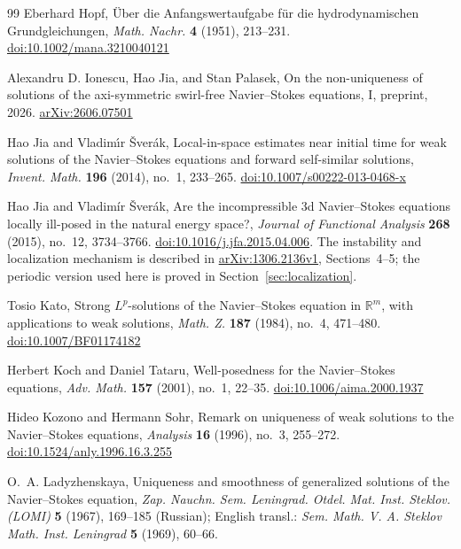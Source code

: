 \begin{thebibliography}{99}
Eberhard Hopf, \"{U}ber die Anfangswertaufgabe f\"{u}r die hydrodynamischen Grundgleichungen,
\emph{Math. Nachr.} \textbf{4} (1951), 213--231.
\href{https://doi.org/10.1002/mana.3210040121}{doi:10.1002/mana.3210040121}

Alexandru D. Ionescu, Hao Jia, and Stan Palasek, On the non-uniqueness of solutions of the axi-symmetric
swirl-free Navier--Stokes equations, I, preprint, 2026.
\href{https://arxiv.org/abs/2606.07501}{arXiv:2606.07501}

Hao Jia and Vladim\'{\i}r \v{S}ver\'{a}k, Local-in-space estimates near initial time for weak solutions of
the Navier--Stokes equations and forward self-similar solutions, \emph{Invent. Math.} \textbf{196}
(2014), no.~1, 233--265.
\href{https://doi.org/10.1007/s00222-013-0468-x}{doi:10.1007/s00222-013-0468-x}

Hao Jia and Vladim\'{i}r \v{S}ver\'{a}k,
Are the incompressible 3d Navier--Stokes equations locally ill-posed
in the natural energy space?,
\emph{Journal of Functional Analysis} \textbf{268} (2015),
no.~12, 3734--3766.
\href{https://doi.org/10.1016/j.jfa.2015.04.006}{doi:10.1016/j.jfa.2015.04.006}.
The instability and localization mechanism is described in
\href{https://arxiv.org/abs/1306.2136v1}{arXiv:1306.2136v1}, Sections~4--5;
the periodic version used here is proved in Section~\ref{sec:localization}.

Tosio Kato, Strong $L^p$-solutions of the Navier--Stokes equation in $\mathbb{R}^m$, with applications
to weak solutions, \emph{Math. Z.} \textbf{187} (1984), no.~4, 471--480.
\href{https://doi.org/10.1007/BF01174182}{doi:10.1007/BF01174182}

Herbert Koch and Daniel Tataru, Well-posedness for the Navier--Stokes equations,
\emph{Adv. Math.} \textbf{157} (2001), no.~1, 22--35.
\href{https://doi.org/10.1006/aima.2000.1937}{doi:10.1006/aima.2000.1937}

Hideo Kozono and Hermann Sohr, Remark on uniqueness of weak solutions to the Navier--Stokes equations,
\emph{Analysis} \textbf{16} (1996), no.~3, 255--272.
\href{https://doi.org/10.1524/anly.1996.16.3.255}{doi:10.1524/anly.1996.16.3.255}

O.~A. Ladyzhenskaya, Uniqueness and smoothness of generalized solutions of the Navier--Stokes equation,
\emph{Zap. Nauchn. Sem. Leningrad. Otdel. Mat. Inst. Steklov. (LOMI)} \textbf{5} (1967), 169--185 (Russian);
English transl.: \emph{Sem. Math. V. A. Steklov Math. Inst. Leningrad} \textbf{5} (1969), 60--66.


\end{thebibliography}
